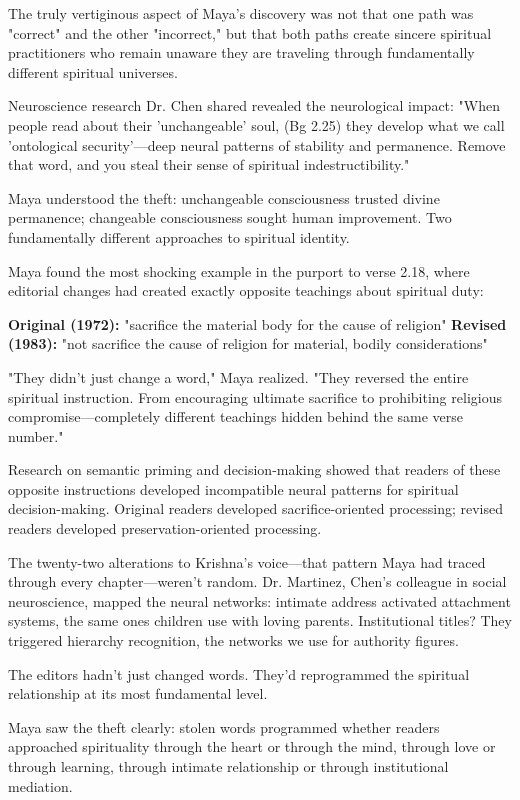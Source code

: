 \documentclass[12pt,twoside]{book}
\begin{document}
The truly vertiginous aspect of Maya's discovery was not that one path was "correct" and the other "incorrect," but that both paths create sincere spiritual practitioners who remain unaware they are traveling through fundamentally different spiritual universes.

Neuroscience research Dr. Chen shared revealed the neurological impact: "When people read about their 'unchangeable' soul, (Bg 2.25) they develop what we call 'ontological security'—deep neural patterns of stability and permanence. Remove that word, and you steal their sense of spiritual indestructibility."

Maya understood the theft: unchangeable consciousness trusted divine permanence; changeable consciousness sought human improvement. Two fundamentally different approaches to spiritual identity.

Maya found the most shocking example in the purport to verse 2.18, where editorial changes had created exactly opposite teachings about spiritual duty:

\textbf{\textbf{Original (1972):}} "sacrifice the material body for the cause of religion"
\textbf{\textbf{Revised (1983):}} "not sacrifice the cause of religion for material, bodily considerations"

"They didn't just change a word," Maya realized. "They reversed the entire spiritual instruction. From encouraging ultimate sacrifice to prohibiting religious compromise—completely different teachings hidden behind the same verse number."

Research on semantic priming and decision-making showed that readers of these opposite instructions developed incompatible neural patterns for spiritual decision-making. Original readers developed sacrifice-oriented processing; revised readers developed preservation-oriented processing.

The twenty-two alterations to Krishna's voice—that pattern Maya had traced through every chapter—weren't random. Dr. Martinez, Chen's colleague in social neuroscience, mapped the neural networks: intimate address activated attachment systems, the same ones children use with loving parents. Institutional titles? They triggered hierarchy recognition, the networks we use for authority figures. 

The editors hadn't just changed words. They'd reprogrammed the spiritual relationship at its most fundamental level.

Maya saw the theft clearly: stolen words programmed whether readers approached spirituality through the heart or through the mind, through love or through learning, through intimate relationship or through institutional mediation.
\end{document}
